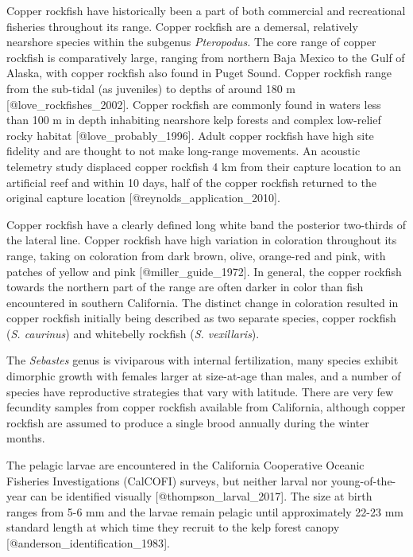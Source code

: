 \documentclass[11pt,
  letterpaper,
]{article}
\begin{document}
Copper rockfish have historically been a part of both commercial and recreational fisheries throughout its range. Copper rockfish are a demersal, relatively nearshore species within the subgenus \emph{Pteropodus.} The core range of copper rockfish is comparatively large, ranging from northern Baja Mexico to the Gulf of Alaska, with copper rockfish also found in Puget Sound. Copper rockfish range from the sub-tidal (as juveniles) to depths of around 180 m {[}@love\_rockfishes\_2002{]}. Copper rockfish are commonly found in waters less than 100 m in depth inhabiting nearshore kelp forests and complex low-relief rocky habitat {[}@love\_probably\_1996{]}. Adult copper rockfish have high site fidelity and are thought to not make long-range movements. An acoustic telemetry study displaced copper rockfish 4 km from their capture location to an artificial reef and within 10 days, half of the copper rockfish returned to the original capture location {[}@reynolds\_application\_2010{]}.

Copper rockfish have a clearly defined long white band the posterior two-thirds of the lateral line. Copper rockfish have high variation in coloration throughout its range, taking on coloration from dark brown, olive, orange-red and pink, with patches of yellow and pink {[}@miller\_guide\_1972{]}. In general, the copper rockfish towards the northern part of the range are often darker in color than fish encountered in southern California. The distinct change in coloration resulted in copper rockfish initially being described as two separate species, copper rockfish (\emph{S. caurinus}) and whitebelly rockfish (\emph{S. vexillaris}).

The \emph{Sebastes} genus is viviparous with internal fertilization, many species exhibit dimorphic growth with females larger at size-at-age than males, and a number of species have reproductive strategies that vary with latitude. There are very few fecundity samples from copper rockfish available from California, although copper rockfish are assumed to produce a single brood annually during the winter months.

The pelagic larvae are encountered in the California Cooperative Oceanic Fisheries Investigations (CalCOFI) surveys, but neither larval nor young-of-the-year can be identified visually {[}@thompson\_larval\_2017{]}. The size at birth ranges from 5-6 mm and the larvae remain pelagic until approximately 22-23 mm standard length at which time they recruit to the kelp forest canopy {[}@anderson\_identification\_1983{]}.
\end{document}
